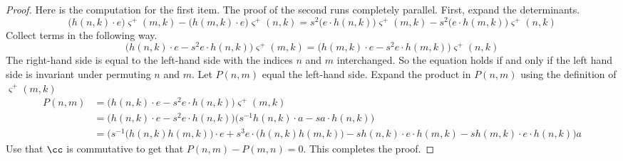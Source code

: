 \begin{proof}
Here is the computation for the first item. The proof of the second runs completely parallel. First, expand the determinants.
\[
\big( h(n, k) \cdot e \big) \varsigma^+ (m, k) - \big( h(m, k) \cdot e \big) \varsigma^+ (n, k) = s^2 \big( e \cdot h(n, k) \big) \varsigma^+ (m, k) - s^2 \big( e \cdot h(m, k) \big) \varsigma^+ (n, k)
\]
Collect terms in the following way.
\[
\big( h(n, k) \cdot e - s^2 e \cdot h(n, k) \big) \varsigma^+ (m, k) = \big( h(m, k) \cdot e - s^2 e \cdot h(m, k) \big) \varsigma^+(n, k)
\]
The right-hand side is equal to the left-hand side with the indices $n$ and $m$ interchanged. So the equation holds if and only if the left hand side is invariant under permuting $n$ and $m$. Let $P(n,m)$ equal the left-hand side. Expand the product in $P(n, m)$ using the definition of $\varsigma^+(m, k)$
\begin{align*}
P(n, m) & = \big( h(n, k) \cdot e - s^2 e \cdot h(n, k) \big) \varsigma^+ (m, k) \\
& = \big( h(n, k) \cdot e - s^2 e \cdot h(n, k) \big) \big( s^{-1} h(n, k) \cdot a - s a \cdot h(n, k) \big) \\
& = \Big( s^{-1} \big( h(n, k) h(m, k) \big) \cdot e + s^3 e \cdot \big( h(n, k) h(m, k) \big) - s h(n, k) \cdot e \cdot h(m, k) - s h(m, k) \cdot e \cdot h(n, k) \Big) a
\end{align*}
Use that $\cc$ is commutative to get that $P(n, m) - P(m, n) = 0$. This completes the proof. 
\end{proof}

